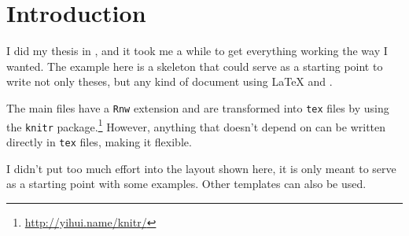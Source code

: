 \section{Introduction}
\label{sec:introduction}

I did my thesis in \R{}, and it took me a while to get everything working the way I wanted. The example here is a skeleton that could serve as a starting point to write not only theses, but any kind of document using \LaTeX{} and \R{}.

The main files have a \texttt{Rnw} extension and are transformed into \texttt{tex} files by using the \texttt{knitr} package.\footnote{\url{http://yihui.name/knitr/}} However, anything that doesn't depend on \R{} can be written directly in \texttt{tex} files, making it flexible.

I didn't put too much effort into the layout shown here, it is only meant to serve as a starting point with some examples. Other templates can also be used.
